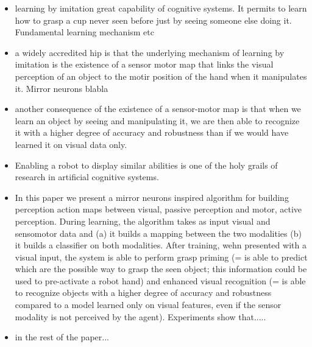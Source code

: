 \begin{itemize}

\item learning by imitation great capability of cognitive systems. It permits to learn how to grasp a cup never seen before just by seeing someone else doing it.
Fundamental learning mechanism etc 

\item a widely accredited hip is that the underlying mechanism of learning by imitation is the existence of a sensor motor map that links
the visual perception of an object to the motir position of the hand when it manipulates it. Mirror neurons blabla 

\item another consequence of the existence of a sensor-motor map is that when we learn an object by seeing and manipulating it, we are then able
to recognize it with a higher degree of accuracy and robustness than if we would have learned it on visual data only. 

\item Enabling a robot to display similar abilities is one of the holy grails of research in artificial cognitive systems. 

\item In this paper we present a mirror neurons inspired algorithm for building perception action maps between visual, passive perception and motor, active
perception. During learning, the algorithm takes as input visual and sensomotor data and (a) it builds a mapping between the two modalities (b) it builds 
a classifier on both modalities. After training, wehn presented with a visual input, the system is able to perform grasp priming (= is able to predict
which are the possible way to grasp the seen object; this information could be used to pre-activate a robot hand) and enhanced visual recognition
(= is able to recognize objects with a higher degree of accuracy and robustness compared to a model learned only on visual features, even if
the sensor modality is not perceived by the agent). Experiments show that.....


\item in the rest of the paper...


\end{itemize}

%
%
%
